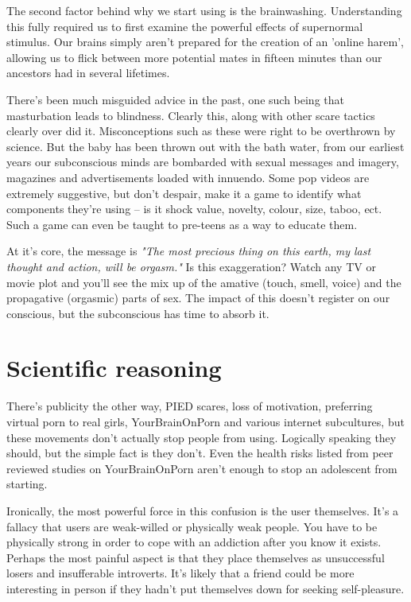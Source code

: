 \documentclass[easypeasy.tex]{subfiles}
\begin{document}
The second factor behind why we start using is the brainwashing. Understanding this fully required us to first examine the powerful effects of supernormal stimulus. Our brains simply aren't prepared for the creation of an 'online harem', allowing us to flick between more potential mates in fifteen minutes than our ancestors had in several lifetimes.

There's been much misguided advice in the past, one such being that masturbation leads to blindness. Clearly this, along with other scare tactics clearly over did it. Misconceptions such as these were right to be overthrown by science. But the baby has been thrown out with the bath water, from our earliest years our subconscious minds are bombarded with sexual messages and imagery, magazines and advertisements loaded with innuendo. Some pop videos are extremely suggestive, but don't despair, make it a game to identify what components they're using -- is it shock value, novelty, colour, size, taboo, ect. Such a game can even be taught to pre-teens as a way to educate them.

At it's core, the message is \textit{"The most precious thing on this earth, my last thought and action, will be orgasm."} Is this exaggeration? Watch any TV or movie plot and you'll see the mix up of the amative (touch, smell, voice) and the propagative (orgasmic) parts of sex. The impact of this doesn't register on our conscious, but the subconscious has time to absorb it.

\section{Scientific reasoning}
There's publicity the other way, PIED scares, loss of motivation, preferring virtual porn to real girls, YourBrainOnPorn and various internet subcultures, but these movements don't actually stop people from using. Logically speaking they should, but the simple fact is they don't. Even the health risks listed from peer reviewed studies on YourBrainOnPorn aren't enough to stop an adolescent from starting.

Ironically, the most powerful force in this confusion is the user themselves. It's a fallacy that users are weak-willed or physically weak people. You have to be physically strong in order to cope with an addiction after you know it exists. Perhaps the most painful aspect is that they place themselves as unsuccessful losers and insufferable introverts. It's likely that a friend could be more interesting in person if they hadn't put themselves down for seeking self-pleasure.
\end{document}

